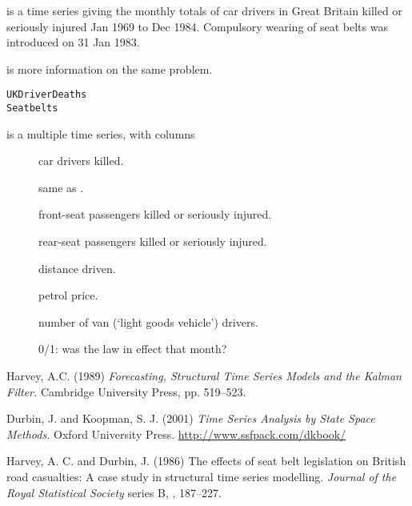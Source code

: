 %
\begin{Description}\relax
{} is a time series giving the monthly totals
of car drivers in
Great Britain killed or seriously injured Jan 1969 to Dec 1984.
Compulsory wearing of seat belts was introduced on 31 Jan 1983.

 is more information on the same problem.
\end{Description}
%
\begin{Usage}
\begin{verbatim}
UKDriverDeaths
Seatbelts
\end{verbatim}
\end{Usage}
%
\begin{Format}
 is a multiple time series, with columns
\begin{description}

\item[] car drivers killed.
\item[] same as .
\item[] front-seat passengers killed or seriously injured.
\item[] rear-seat passengers killed or seriously injured.
\item[] distance driven.
\item[] petrol price.
\item[] number of van (`light goods vehicle')
drivers.
\item[] 0/1: was the law in effect that month?

\end{description}

\end{Format}
%
\begin{Source}\relax
Harvey, A.C. (1989)
\emph{Forecasting, Structural Time Series Models and the Kalman Filter.}
Cambridge University Press, pp. 519--523.

Durbin, J. and Koopman, S. J. (2001) \emph{Time Series Analysis by
State Space Methods.}  Oxford University Press.
\url{http://www.ssfpack.com/dkbook/}
\end{Source}
%
\begin{References}\relax
Harvey, A. C. and Durbin, J. (1986) The effects of seat belt
legislation on British road casualties: A case study in structural
time series modelling. \emph{Journal of the Royal Statistical Society}
series B, , 187--227.
\end{References}
